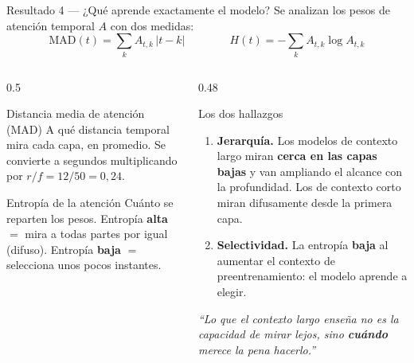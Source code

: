 \documentclass[aspectratio=169,10pt]{beamer}
\newcommand{\term}[1]{\textbf{\color{deepgreen}#1}}
\begin{document}
\begin{frame}[c]{Resultado 4 --- ¿Qué aprende exactamente el modelo?}
  \small
  Se analizan los pesos de atención temporal $A$ con dos medidas:
  \[ \text{MAD}(t) = \sum_k A_{t,k}\,|t-k| \qquad\qquad H(t) = -\sum_k A_{t,k}\log A_{t,k} \]
  \begin{columns}[t,totalwidth=\linewidth]
    \begin{column}{0.5\linewidth}
      \begin{block}{Distancia media de atención (MAD)}
        \footnotesize A qué distancia temporal mira cada capa, en promedio. Se convierte a segundos multiplicando por $r/f = 12/50 = 0{,}24$.
      \end{block}
      \begin{block}{Entropía de la atención}
        \footnotesize Cuánto se reparten los pesos. Entropía \term{alta} $=$ mira a todas partes por igual (difuso). Entropía \term{baja} $=$ selecciona unos pocos instantes.
      \end{block}
    \end{column}
    \begin{column}{0.48\linewidth}
      \begin{exampleblock}{Los dos hallazgos}
        \begin{enumerate}\footnotesize
          \item \term{Jerarquía.} Los modelos de contexto largo miran \term{cerca en las capas bajas} y van ampliando el alcance con la profundidad. Los de contexto corto miran difusamente desde la primera capa.
          \item \term{Selectividad.} La entropía \term{baja} al aumentar el contexto de preentrenamiento: el modelo aprende a elegir.
        \end{enumerate}
      \end{exampleblock}
      \vspace{1mm}
      \centering
      {\footnotesize\itshape ``Lo que el contexto largo enseña no es la capacidad de mirar lejos, sino \term{cuándo} merece la pena hacerlo.''}
    \end{column}
  \end{columns}
\end{frame}
\end{document}
